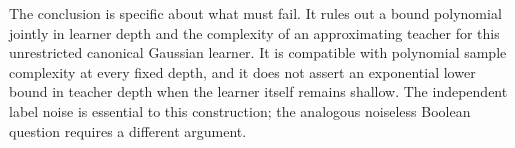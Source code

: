 The conclusion is specific about what must fail. It rules out a bound polynomial jointly in learner depth and the complexity of an approximating teacher for this unrestricted canonical Gaussian learner. It is compatible with polynomial sample complexity at every fixed depth, and it does not assert an exponential lower bound in teacher depth when the learner itself remains shallow. The independent label noise is essential to this construction; the analogous noiseless Boolean question requires a different argument.
